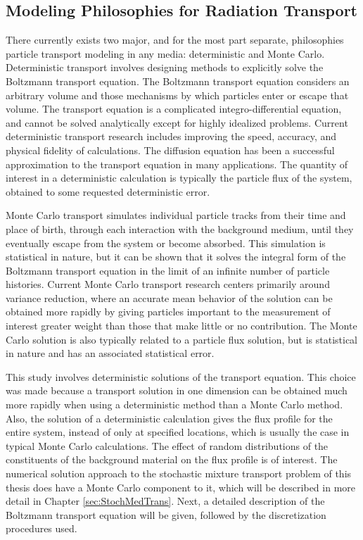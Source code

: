 \subsection{Modeling Philosophies for Radiation Transport}
\label{sec:Transport-Modeling}

\noindent
	\indent There currently exists two major, and for the most part separate, philosophies
	particle transport modeling in any media: deterministic and Monte Carlo.  Deterministic
	transport involves designing methods to explicitly solve the Boltzmann transport
	equation.  The Boltzmann transport equation considers an arbitrary volume and those
	mechanisms by which particles enter or escape that volume.  The transport equation is a
	complicated integro-differential equation, and cannot be solved analytically except for highly
	idealized problems.  Current deterministic transport research includes improving the speed, 
	accuracy, and physical fidelity of calculations.  The diffusion equation has been a successful
	approximation to the transport equation in many applications.  The quantity of interest in a 
	deterministic calculation is typically the particle flux of the system, obtained to some requested
	deterministic error. 
	
	Monte Carlo transport simulates individual particle tracks from their time and place of birth,
	through each interaction with the background medium, until they eventually escape from the
	system or become absorbed.  This simulation is statistical in nature, but it can be shown that it
	solves the integral form of the Boltzmann transport equation in the limit of an infinite number of
	particle histories.  Current Monte Carlo transport research centers primarily around variance
	reduction, where an accurate mean behavior of the solution can be obtained more rapidly by
	giving particles important to the measurement of interest greater weight than those that make little
	or no contribution.  The Monte Carlo solution is also typically related to a particle flux solution, but
	is statistical in nature and has an associated statistical error.  
	
	This study involves deterministic solutions of the transport equation.  This choice was made
	because a transport solution in one dimension can be obtained much more rapidly when using
	a deterministic method than a Monte Carlo method.   Also, the solution of a deterministic
	calculation gives the flux profile for the entire system, instead of only at specified locations, which
	is usually the case in typical Monte Carlo calculations.  The effect of random distributions of the
	constituents of the background material on the flux profile is of interest.  The numerical solution
	approach to the stochastic mixture transport problem of this thesis does have a Monte Carlo
	component to it, which will be described in more detail in Chapter \ref{sec:StochMedTrans}.  Next,
	a detailed description of the Boltzmann transport equation will be given, followed by the
	discretization procedures used. 

